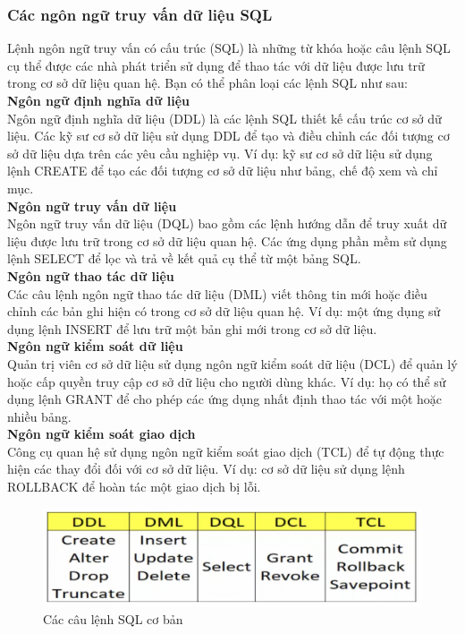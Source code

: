 \subsubsection{Các ngôn ngữ truy vấn dữ liệu SQL}
\hspace*{1cm}Lệnh ngôn ngữ truy vấn có cấu trúc (SQL) là những từ khóa hoặc câu lệnh SQL cụ thể được các nhà phát triển sử dụng để thao tác với dữ liệu được lưu trữ trong cơ sở dữ liệu quan hệ. Bạn có thể phân loại các lệnh SQL như sau:\\
\hspace*{1cm}\textbf{Ngôn ngữ định nghĩa dữ liệu}\\
\hspace*{1cm}Ngôn ngữ định nghĩa dữ liệu (DDL) là các lệnh SQL thiết kế cấu trúc cơ sở dữ liệu. Các kỹ sư cơ sở dữ liệu sử dụng DDL để tạo và điều chỉnh các đối tượng cơ sở dữ liệu dựa trên các yêu cầu nghiệp vụ. Ví dụ: kỹ sư cơ sở dữ liệu sử dụng lệnh CREATE để tạo các đối tượng cơ sở dữ liệu như bảng, chế độ xem và chỉ mục.\\
\hspace*{1cm}\textbf{Ngôn ngữ truy vấn dữ liệu}\\
\hspace*{1cm}Ngôn ngữ truy vấn dữ liệu (DQL) bao gồm các lệnh hướng dẫn để truy xuất dữ liệu được lưu trữ trong cơ sở dữ liệu quan hệ. Các ứng dụng phần mềm sử dụng lệnh SELECT để lọc và trả về kết quả cụ thể từ một bảng SQL.\\ 
\hspace*{1cm}\textbf{Ngôn ngữ thao tác dữ liệu}\\
\hspace*{1cm}Các câu lệnh ngôn ngữ thao tác dữ liệu (DML) viết thông tin mới hoặc điều chỉnh các bản ghi hiện có trong cơ sở dữ liệu quan hệ. Ví dụ: một ứng dụng sử dụng lệnh INSERT để lưu trữ một bản ghi mới trong cơ sở dữ liệu.\\
\hspace*{1cm}\textbf{Ngôn ngữ kiểm soát dữ liệu}\\
\hspace*{1cm}Quản trị viên cơ sở dữ liệu sử dụng ngôn ngữ kiểm soát dữ liệu (DCL) để quản lý hoặc cấp quyền truy cập cơ sở dữ liệu cho người dùng khác. Ví dụ: họ có thể sử dụng lệnh GRANT để cho phép các ứng dụng nhất định thao tác với một hoặc nhiều bảng.\\
\hspace*{1cm}\textbf{Ngôn ngữ kiểm soát giao dịch}\\
\hspace*{1cm}Công cụ quan hệ sử dụng ngôn ngữ kiểm soát giao dịch (TCL) để tự động thực hiện các thay đổi đối với cơ sở dữ liệu. Ví dụ: cơ sở dữ liệu sử dụng lệnh ROLLBACK để hoàn tác một giao dịch bị lỗi.
\begin{figure}[H]
    \centering
    \includegraphics[width=\textwidth]{Images/lệnh SQL.png}
    \vspace{0.5cm}
    \caption{Các câu lệnh SQL cơ bản}
\end{figure}

